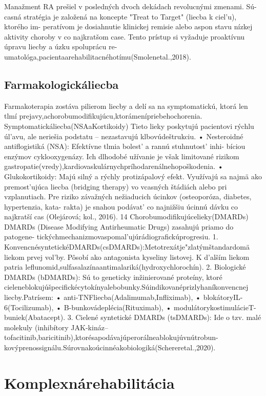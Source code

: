 Manažment RA prešiel v posledných dvoch dekádach revolucnými zmenami. Sú- casná stratégia je založená na koncepte "Treat to Target" (liecba k ciel’u), ktorého im- peratívom je dosiahnutie klinickej remisie alebo aspon stavu nízkej aktivity choroby v co najkratšom case. Tento prístup si vyžaduje proaktívnu úpravu liecby a úzku spoluprácu re- umatológa,pacientaarehabilitacnéhotímu(Smolenetal.,2018).


\subsection{Farmakologickáliecba}

Farmakoterapia zostáva pilierom liecby a delí sa na symptomatickú, ktorá len tlmí prejavy,achorobumodifikujúcu,ktorámenípriebehochorenia. Symptomatickáliecba(NSAaKortikoidy) Tieto lieky poskytujú pacientovi rýchlu úl’avu, ale neriešia podstatu -- nezastavujú klbovúdeštrukciu. • Nesteroidné antiflogistiká (NSA): Efektívne tlmia bolest’ a rannú stuhnutost’ inhi- bíciou enzýmov cyklooxygenázy. Ich dlhodobé užívanie je však limitované rizikom gastropatie(vredy),kardiovaskulárnychpríhodarenálnehopoškodenia. • Glukokortikoidy: Majú silný a rýchly protizápalový efekt. Využívajú sa najmä ako premost’ujúca liecba (bridging therapy) vo vcasných štádiách alebo pri vzplanutiach. Pre riziko závažných nežiaducich úcinkov (osteoporóza, diabetes, hypertenzia, kata- rakta) je snahou podávat’ co najnižšiu úcinnú dávku co najkratší cas (Olejárová; kol., 2016). 14 Chorobumodifikujúcelieky(DMARDs) DMARDs (Disease Modifying Antirheumatic Drugs) zasahujú priamo do patogene- tickýchmechanizmovaspomal’ujúrádiografickúprogresiu. 1. KonvencnésyntetickéDMARDs(csDMARDs):Metotrexátje"zlatýmštandardomä liekom prvej vol’by. Pôsobí ako antagonista kyseliny listovej. K d’alším liekom patria leflunomid,sulfasalazínaantimalariká(hydroxychlorochín). 2. Biologické DMARDs (bDMARDs): Sú to geneticky inžinierované proteíny, ktoré cieleneblokujúšpecifickécytokínyalebobunky.Súindikovanéprizlyhaníkonvencnej liecby.Patrísem: • anti-TNFliecba(Adalimumab,Infliximab), • blokátoryIL-6(Tocilizumab), • B-bunkovádeplécia(Rituximab), • modulátorykostimulácieT-buniek(Abatacept). 3. Cielené syntetické DMARDs (tsDMARDs): Ide o tzv. malé molekuly (inhibítory JAK-kináz--tofacitinib,baricitinib),ktorésapodávajúperorálneablokujúvnútrobun- kovýprenossignálu.Súrovnakoúcinnéakobiologiká(Schereretal.,2020).


\section{Komplexnárehabilitácia}

